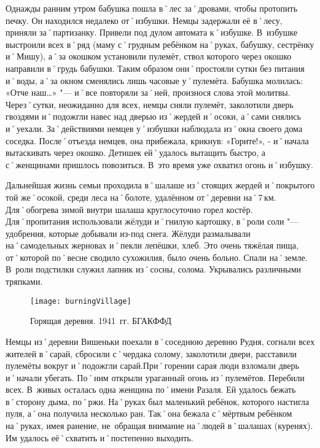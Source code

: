 Однажды ранним утром бабушка пошла в˚лес за˚дровами, чтобы протопить печку. Он находился недалеко от˚избушки. Немцы задержали её в˚лесу, приняли за˚партизанку. Привели под дулом автомата к˚избушке. В~избушке выстроили всех в˚ряд (маму с˚грудным ребёнком на˚руках, бабушку, сестрёнку и˚Мишу), а˚за окошком установили пулемёт, ствол которого через окошко направили в˚грудь бабушки. Таким образом они˚простояли сутки без питания и˚воды, а˚за окном сменялись лишь часовые у˚пулемёта. Бабушка молилась: «Отче наш…» "--- и˚все повторяли за˚ней, произнося слова этой молитвы. Через˚сутки, неожиданно для всех, немцы сняли пулемёт, заколотили дверь гвоздями и˚подожгли навес над дверью из˚жердей и˚осоки, а˚сами снялись и˚уехали. За˚действиями немцев у˚избушки наблюдала из˚окна своего дома соседка. После˚отъезда немцев, она прибежала, крикнув: «Горите!», - и˚начала вытаскивать через окошко. Детишек ей˚удалось вытащить быстро, а с˚женщинами пришлось повозиться. В~это время уже охватил огонь и˚избушку.

Дальнейшая жизнь семьи проходила в˚шалаше из˚стоящих жердей и˚покрытого той же˚осокой, среди леса на˚болоте, удалённом от˚деревни на˚7\,км. Для˚обогрева зимой внутри шалаша круглосуточно горел костёр. Для˚пропитания использовали жёлуди и˚гнилую картошку, в˚роли соли "--- удобрения, которые добывали из-под снега. Жёлуди размалывали на˚самодельных жерновах и˚пекли лепёшки, хлеб. Это очень тяжёлая пища, от˚которой по˚весне сводило сухожилия, было очень больно. Спали на˚земле. В~роли подстилки служил лапник из˚сосны, солома. Укрывались различными тряпками.


\begin{wrapfigure}{O}{.4\textwidth}
\centering
\texttt{[image: burningVillage]}
\caption[Горящая деревня. 1941~гг. БГАКФФД]{Горящая деревня. 1941~гг. БГАКФФД\footnotemark}
\label{fig:burningVillage}
\end{wrapfigure}

Немцы из˚деревни Вишеньки поехали в˚соседнюю деревню Рудня, согнали всех жителей в˚сарай, сбросили с˚чердака солому, заколотили двери, расставили пулемёты вокруг и˚подожгли сарай.При˚горении сарая люди взломали дверь и˚начали убегать. По˚ним открыли ураганный огонь из˚пулемётов. Перебили всех. В~живых осталась одна женщина по˚имени Разаля. Ей удалось бежать в˚сторону дыма, по˚ржи. На˚руках был маленький ребёнок, которого настигла пуля, а˚она получила несколько ран. Так˚она бежала с˚мёртвым ребёнком на˚руках, имея ранение, не~обращая внимание на˚людей в˚шалашах (куренях). Им удалось её˚схватить и˚постепенно выходить. 


